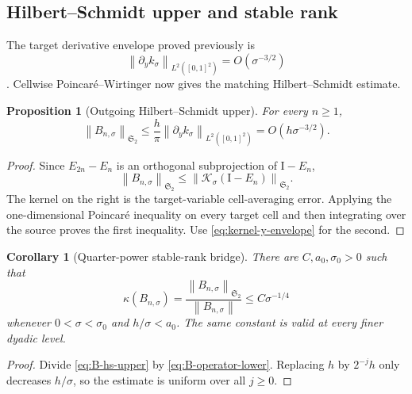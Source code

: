 \documentclass[11pt]{article}
\newtheorem{proposition}[theorem]{Proposition}
\newtheorem{corollary}[theorem]{Corollary}
\theoremstyle{definition}
\theoremstyle{remark}
\newcommand{\Id}{\mathrm I}
\newcommand{\cK}{\mathcal K}
\newcommand{\HS}{\mathfrak S_2}
\newcommand{\norm}[1]{\left\lVert #1\right\rVert}
\begin{document}
\subsection{Hilbert--Schmidt upper and stable rank}

The target derivative envelope proved previously is
\begin{equation}
 \norm{\partial_yk_\sigma}_{L^2([0,1]^2)}
 =O(\sigma^{-3/2})
 \label{eq:kernel-y-envelope}
\end{equation}
\citep{WangSmallNoiseMesh2026}.  Cellwise Poincar\'e--Wirtinger now gives the
matching Hilbert--Schmidt estimate.

\begin{proposition}[Outgoing Hilbert--Schmidt upper]
\label{prop:B-hs-upper}
For every \(n\ge1\),
\begin{equation}
 \norm{B_{n,\sigma}}_{\HS}
 \le\frac{h}{\pi}
 \norm{\partial_yk_\sigma}_{L^2([0,1]^2)}
 =O(h\sigma^{-3/2}).
 \label{eq:B-hs-upper}
\end{equation}
\end{proposition}

\begin{proof}
Since \(E_{2n}-E_n\) is an orthogonal subprojection of \(\Id-E_n\),
\[
 \norm{B_{n,\sigma}}_{\HS}
 \le\norm{\cK_\sigma(\Id-E_n)}_{\HS}.
\]
The kernel on the right is the target-variable cell-averaging error.
Applying the one-dimensional Poincar\'e inequality on every target cell and
then integrating over the source proves the first inequality.  Use
\eqref{eq:kernel-y-envelope} for the second.
\end{proof}

\begin{corollary}[Quarter-power stable-rank bridge]
\label{cor:quarter-stable-rank}
There are \(C,a_0,\sigma_0>0\) such that
\begin{equation}
 \boxed{
 \kappa(B_{n,\sigma})
 =\frac{\norm{B_{n,\sigma}}_{\HS}}
 {\norm{B_{n,\sigma}}}
 \le C\sigma^{-1/4}}
 \label{eq:B-stable-rank}
\end{equation}
whenever \(0<\sigma<\sigma_0\) and \(h/\sigma<a_0\).  The same constant is
valid at every finer dyadic level.
\end{corollary}

\begin{proof}
Divide \eqref{eq:B-hs-upper} by \eqref{eq:B-operator-lower}.  Replacing
\(h\) by \(2^{-j}h\) only decreases \(h/\sigma\), so the estimate is uniform
over all \(j\ge0\).
\end{proof}
\end{document}
